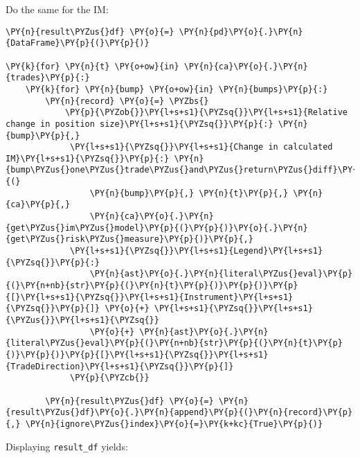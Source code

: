     Do the same for the IM:

    \begin{tcolorbox}[breakable, size=fbox, boxrule=1pt, pad at break*=1mm,colback=cellbackground, colframe=cellborder]
\begin{Verbatim}[commandchars=\\\{\}]
\PY{n}{result\PYZus{}df} \PY{o}{=} \PY{n}{pd}\PY{o}{.}\PY{n}{DataFrame}\PY{p}{(}\PY{p}{)}

\PY{k}{for} \PY{n}{t} \PY{o+ow}{in} \PY{n}{ca}\PY{o}{.}\PY{n}{trades}\PY{p}{:}
    \PY{k}{for} \PY{n}{bump} \PY{o+ow}{in} \PY{n}{bumps}\PY{p}{:}
        \PY{n}{record} \PY{o}{=} \PYZbs{}
            \PY{p}{\PYZob{}}\PY{l+s+s1}{\PYZsq{}}\PY{l+s+s1}{Relative change in position size}\PY{l+s+s1}{\PYZsq{}}\PY{p}{:} \PY{n}{bump}\PY{p}{,}
             \PY{l+s+s1}{\PYZsq{}}\PY{l+s+s1}{Change in calculated IM}\PY{l+s+s1}{\PYZsq{}}\PY{p}{:} \PY{n}{bump\PYZus{}one\PYZus{}trade\PYZus{}and\PYZus{}return\PYZus{}diff}\PY{p}{(}
                 \PY{n}{bump}\PY{p}{,} \PY{n}{t}\PY{p}{,} \PY{n}{ca}\PY{p}{,}
                 \PY{n}{ca}\PY{o}{.}\PY{n}{get\PYZus{}im\PYZus{}model}\PY{p}{(}\PY{p}{)}\PY{o}{.}\PY{n}{get\PYZus{}risk\PYZus{}measure}\PY{p}{)}\PY{p}{,}
             \PY{l+s+s1}{\PYZsq{}}\PY{l+s+s1}{Legend}\PY{l+s+s1}{\PYZsq{}}\PY{p}{:}
                 \PY{n}{ast}\PY{o}{.}\PY{n}{literal\PYZus{}eval}\PY{p}{(}\PY{n+nb}{str}\PY{p}{(}\PY{n}{t}\PY{p}{)}\PY{p}{)}\PY{p}{[}\PY{l+s+s1}{\PYZsq{}}\PY{l+s+s1}{Instrument}\PY{l+s+s1}{\PYZsq{}}\PY{p}{]} \PY{o}{+} \PY{l+s+s1}{\PYZsq{}}\PY{l+s+s1}{\PYZus{}}\PY{l+s+s1}{\PYZsq{}}
                 \PY{o}{+} \PY{n}{ast}\PY{o}{.}\PY{n}{literal\PYZus{}eval}\PY{p}{(}\PY{n+nb}{str}\PY{p}{(}\PY{n}{t}\PY{p}{)}\PY{p}{)}\PY{p}{[}\PY{l+s+s1}{\PYZsq{}}\PY{l+s+s1}{TradeDirection}\PY{l+s+s1}{\PYZsq{}}\PY{p}{]}
             \PY{p}{\PYZcb{}}

        \PY{n}{result\PYZus{}df} \PY{o}{=} \PY{n}{result\PYZus{}df}\PY{o}{.}\PY{n}{append}\PY{p}{(}\PY{n}{record}\PY{p}{,} \PY{n}{ignore\PYZus{}index}\PY{o}{=}\PY{k+kc}{True}\PY{p}{)}
\end{Verbatim}
\end{tcolorbox}

    Displaying \texttt{result\_df} yields:
 
            
            \begin{tcolorbox}[breakable, size=fbox, boxrule=.5pt, pad at break*=1mm, opacityfill=0]
    \begin{center}
    \end{center}
    { \hspace*{\fill} \\}
\end{tcolorbox}
    

